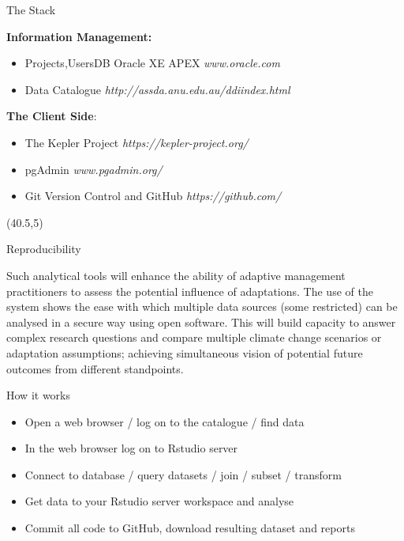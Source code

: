 \documentclass[final]{beamer}
\begin{document}
\begin{frame}{}
\begin{textblock}{17}
\begin{block}{The Stack}
\begin{tiny}
\textbf{Information Management:}
\begin{itemize}
\item Projects,UsersDB Oracle XE APEX \emph{www.oracle.com}
\item Data Catalogue \emph{http://assda.anu.edu.au/ddiindex.html}
\end{itemize}

\textbf{The Client Side}:
\begin{itemize}
\item The Kepler Project \emph{https://kepler-project.org/‎}
\item pgAdmin \emph{www.pgadmin.org/‎}
\item Git Version Control and GitHub \emph{https://github.com/}
\end{itemize}


\end{tiny}
\end{block}

\end{textblock}

\begin{textblock}{17}(40.5,5)

\begin{block}{Reproducibility}
\begin{scriptsize}
Such analytical tools will enhance the ability of adaptive management practitioners to assess the potential influence of adaptations. The use of the system shows the ease with which multiple data sources (some restricted) can be analysed in a secure way using open software. This will build capacity to answer complex research questions and compare multiple climate change scenarios or adaptation assumptions; achieving simultaneous vision of potential future outcomes from different standpoints.
\end{scriptsize}  

\end{block}

\begin{block}{How it works}
\begin{scriptsize}
\begin{itemize}
\item Open a web browser / log on to the catalogue / find data
\item In the web browser log on to Rstudio server
\item Connect to database / query datasets / join / subset / transform
\item Get data to your Rstudio server workspace and analyse
\item Commit all code to GitHub, download resulting dataset and reports 
\end{itemize}
\end{scriptsize}
\end{block}


\end{textblock}
\end{frame}
\end{document}
